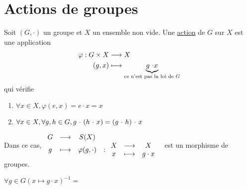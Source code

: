 \part{Actions de groupes}

\begin{defn}
	Soit $(G, \cdot)$ un groupe et $X$ un ensemble non vide. Une \underline{action} de $G$ sur $X$ est une application \begin{align*}
		\varphi: G\times X &\longrightarrow X \\
		(g,x) &\longmapsto \underbrace{g~{\color{red} \cdot} x}_{\text{ce n'est pas la loi de $G$}}
	\end{align*}
	qui vérifie
	\begin{enumerate}
		\item $\forall x \in X, \varphi(e,x) = e \cdot x = x$
		\item $\forall x \in X, \forall g,h \in G, g ~{\color{red} \cdot}~ (h~{\color{red} \cdot}~ x) = (g ~{\color{blue} \cdot}~ h)~{\color{red} \cdot}~ x$
	\end{enumerate}
	Dans ce cas,
	$\begin{array}{c c c c}
		G &\longrightarrow& S(X)&\\
		g &\longmapsto& \varphi(g, \cdot)&:
		\begin{array}{c c c}
			X &\longrightarrow& X\\
			x &\longmapsto& g\cdot x
		\end{array}
	\end{array}$ est un morphisme de groupes.\\
\end{defn}

\begin{prv}
	$\forall g \in G \left( x\mapsto g\cdot x \right) ^{-1} = $
\end{prv}
